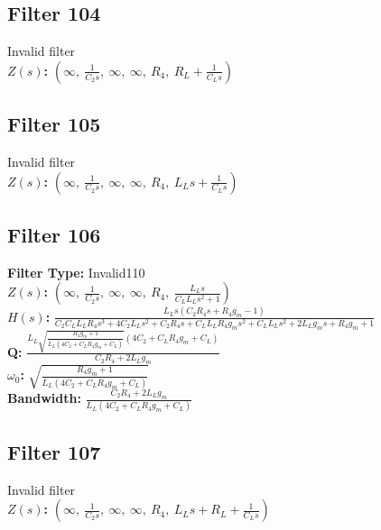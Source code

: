 \documentclass{article}
\begin{document}
\subsection*{Filter 104}
Invalid filter \\ 
\textbf{$Z(s)$:} $\left( \infty, \  \frac{1}{C_{2} s}, \  \infty, \  \infty, \  R_{4}, \  R_{L} + \frac{1}{C_{L} s}\right)$ \\ 
\subsection*{Filter 105}
Invalid filter \\ 
\textbf{$Z(s)$:} $\left( \infty, \  \frac{1}{C_{2} s}, \  \infty, \  \infty, \  R_{4}, \  L_{L} s + \frac{1}{C_{L} s}\right)$ \\ 
\subsection*{Filter 106}
\textbf{Filter Type:} Invalid110 \\ 
\textbf{$Z(s)$:} $\left( \infty, \  \frac{1}{C_{2} s}, \  \infty, \  \infty, \  R_{4}, \  \frac{L_{L} s}{C_{L} L_{L} s^{2} + 1}\right)$ \\ 
\textbf{$H(s)$:} $\frac{L_{L} s \left(C_{2} R_{4} s + R_{4} g_{m} - 1\right)}{C_{2} C_{L} L_{L} R_{4} s^{3} + 4 C_{2} L_{L} s^{2} + C_{2} R_{4} s + C_{L} L_{L} R_{4} g_{m} s^{2} + C_{L} L_{L} s^{2} + 2 L_{L} g_{m} s + R_{4} g_{m} + 1}$ \\ 
\textbf{Q:} $\frac{L_{L} \sqrt{\frac{R_{4} g_{m} + 1}{L_{L} \left(4 C_{2} + C_{L} R_{4} g_{m} + C_{L}\right)}} \left(4 C_{2} + C_{L} R_{4} g_{m} + C_{L}\right)}{C_{2} R_{4} + 2 L_{L} g_{m}}$ \\ 
\textbf{$\omega_0$:} $\sqrt{\frac{R_{4} g_{m} + 1}{L_{L} \left(4 C_{2} + C_{L} R_{4} g_{m} + C_{L}\right)}}$ \\ 
\textbf{Bandwidth:} $\frac{C_{2} R_{4} + 2 L_{L} g_{m}}{L_{L} \left(4 C_{2} + C_{L} R_{4} g_{m} + C_{L}\right)}$ \\ 
\subsection*{Filter 107}
Invalid filter \\ 
\textbf{$Z(s)$:} $\left( \infty, \  \frac{1}{C_{2} s}, \  \infty, \  \infty, \  R_{4}, \  L_{L} s + R_{L} + \frac{1}{C_{L} s}\right)$ \\ 
\end{document}
